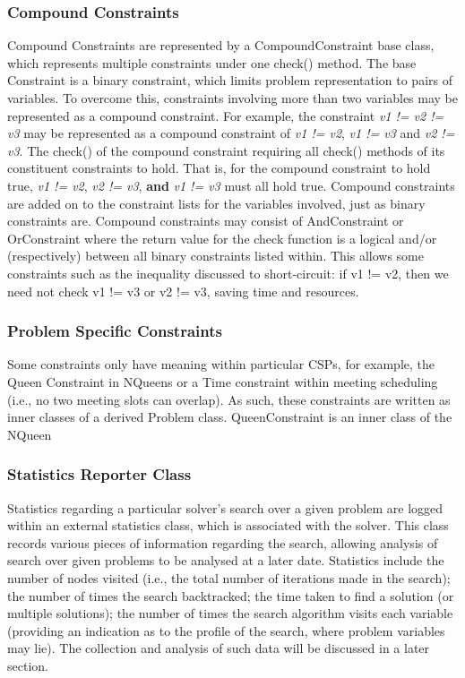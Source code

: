 \documentclass{article}
\begin{document}
\subsubsection*{Compound Constraints}
Compound Constraints are represented by a CompoundConstraint base class, which represents multiple constraints under one check() method. The base Constraint is a binary constraint, which limits problem representation to pairs of variables. To overcome this, constraints involving more than two variables may be represented as a compound constraint. For example, the constraint \textit{v1 != v2 != v3} may be represented as a compound constraint of \textit{v1 != v2}, \textit{v1 != v3} and \textit{v2 != v3}. The check() of the compound constraint requiring all check() methods of its constituent constraints to hold. That is, for the compound constraint to hold true, \textit{v1 != v2}, \textit{v2 != v3}, \textbf{and} \textit{v1 != v3} must all hold true. Compound constraints are added on to the constraint lists for the variables involved, just as binary constraints are. Compound constraints may consist of AndConstraint or OrConstraint where the return value for the check function is a logical and/or (respectively) between all binary constraints listed within. This allows some constraints such as the inequality discussed to short-circuit: if v1 != v2, then we need not check v1 != v3 or v2 != v3, saving time and resources.

\subsubsection*{Problem Specific Constraints}
Some constraints only have meaning within particular CSPs, for example, the Queen Constraint in NQueens or a Time constraint within meeting scheduling (i.e., no two meeting slots can overlap). As such, these constraints are written as inner classes of a derived Problem class. QueenConstraint is an inner class of the NQueen

\subsubsection*{Statistics Reporter Class} 
Statistics regarding a particular solver's search over a given problem are logged within an external statistics class, which is associated with the solver. This class records various pieces of information regarding the search, allowing analysis of search over given problems to be analysed at a later date. Statistics include the number of nodes visited (i.e., the total number of iterations made in the search); the number of times the search backtracked; the time taken to find a solution (or multiple solutions); the number of times the search algorithm visits each variable (providing an indication as to the profile of the search, where problem variables may lie). The collection and analysis of such data will be discussed in a later section.
\end{document}
